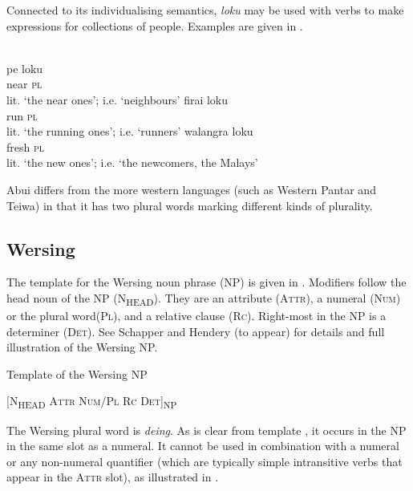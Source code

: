 Connected to its individualising semantics, \textit{loku} may be used with verbs to make expressions for collections of people. Examples are given in .


\ea%
\label{ex:9:54}
\ea
{} \\
\gll pe loku  \\
   near \textsc{pl}  \\
\glt lit. `the near ones'; i.e. `neighbours'
\ex
\gll firai loku \\
  run \textsc{pl}   \\
 \glt lit. `the running ones'; i.e. `runners'
\glt
\ex
\gll walangra loku \\
   fresh \textsc{pl}  \\
\glt  lit. `the new ones'; i.e. `the newcomers, the Malays'
\z
\z






Abui differs from the more western languages (such as Western Pantar and Teiwa) in that it has two plural words marking different kinds of plurality.

\subsection{Wersing} %
\label{sec:9:3.5}
The template for the Wersing noun phrase (NP) is given in . Modifiers follow the head noun of the NP (\textsc{N}\textsubscript{\MakeUppercase{head}}). They are an attribute (\textsc{Attr}), a numeral (\textsc{Num}) or the plural word\textsc{(Pl),} and a relative clause (\textsc{Rc).} \textsc{R}ight-most in the NP is a determiner (\textsc{Det}). See Schapper and Hendery (to appear) for details and full illustration of the Wersing NP.

\ea%
\label{ex:9:55}
\upshape 
 Template of the Wersing NP \citep{SchapperEtAlta}

  [\textsc{N}\textsubscript{\MakeUppercase{head } }\textsc{Attr Num/Pl  Rc  Det]}\textsc{\textsubscript{NP}}
\z


The Wersing plural word is \textit{deing}. As is clear from template , it occurs in the NP in the same slot as a numeral. It cannot be used in combination with a numeral or any non-numeral quantifier (which are typically simple intransitive verbs that appear in the \textsc{Attr} slot), as illustrated in .


